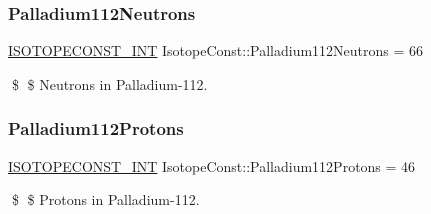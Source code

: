 \subsubsection{\texorpdfstring{Palladium112\+Neutrons}{Palladium112Neutrons}}
{\footnotesize\ttfamily \mbox{\hyperlink{group___isotope_const-_macros_ga5f18360b3e99483a35c32d789e62621c}{I\+S\+O\+T\+O\+P\+E\+C\+O\+N\+S\+T\+\_\+\+I\+NT}} Isotope\+Const\+::\+Palladium112\+Neutrons = 66}

\$ \$ Neutrons in Palladium-\/112. \mbox{\label{group___isotope_const-_palladium-_pd112_gae6d8712adb1cda1c1801a3f373fa8349}} 
\subsubsection{\texorpdfstring{Palladium112\+Protons}{Palladium112Protons}}
{\footnotesize\ttfamily \mbox{\hyperlink{group___isotope_const-_macros_ga5f18360b3e99483a35c32d789e62621c}{I\+S\+O\+T\+O\+P\+E\+C\+O\+N\+S\+T\+\_\+\+I\+NT}} Isotope\+Const\+::\+Palladium112\+Protons = 46}

\$ \$ Protons in Palladium-\/112. 